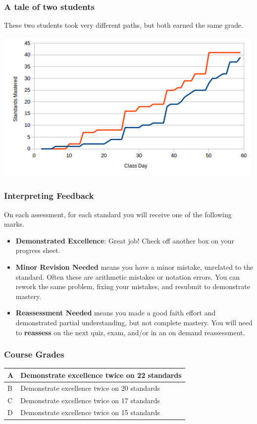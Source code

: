 \documentclass[aspectratio=1610]{beamer}
\begin{document}
\begin{frame}\frametitle{A tale of two students}
These two students took very different paths, but both earned the same grade.
\begin{center}
\includegraphics[scale=0.7]{student-comparison.png}
\end{center}
\end{frame}



\begin{frame}\frametitle{Interpreting Feedback}
On each assessment, for each standard you will receive one of the following marks.
\begin{itemize}
\item {\bf Demonstrated Excellence}: Great job!  Check off another box on your progress sheet.
\item {\bf Minor Revision Needed} means you have a minor mistake, unrelated to the standard. Often these are arithmetic mistakes or notation errors. You can rework the same problem, fixing your mistakes, and resubmit to demonstrate mastery.
\item {\bf Reassessment Needed} means you made a good faith effort and demonstrated
      partial understanding, but not complete mastery. You will need to \textbf{reassess} on the next quiz, exam, and/or in an on demand reassessment.
\end{itemize}

\vspace{0.2in}

\end{frame}




\begin{frame}\frametitle{Course Grades}

\begin{center}
\begin{tabular}{ll} \hline
A & Demonstrate excellence twice on 22 standards\\ \hline
B & Demonstrate excellence twice on 20 standards\\ \hline
C & Demonstrate excellence twice on 17 standards\\ \hline
D & Demonstrate excellence twice on 15 standards\\ \hline
\end{tabular}
\end{center}

\end{frame}
\end{document}
